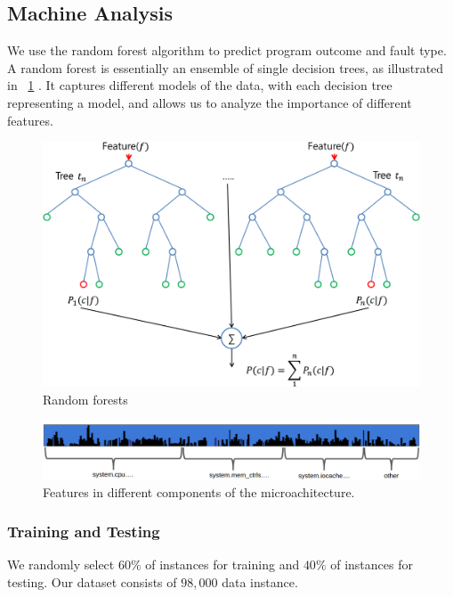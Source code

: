 
\subsection{Machine Analysis}
We use the random forest algorithm to predict program outcome and fault type. A random forest is essentially an ensemble of single decision trees, as illustrated in ~\ref{fig:rf} \cite{breiman2001random}. It captures different models of the data, with each decision tree representing a model, and allows us to analyze the importance of different features. 

\begin{figure}[t]
\begin{center}
   \includegraphics[width=0.95\linewidth]{./figures/rf.png}
\end{center}
   \caption{\footnotesize Random forests}
\label{fig:rf}
\end{figure}


\begin{figure}[t]
\begin{center}
   \includegraphics[width=0.95\linewidth]{./figures/feat_dist.png}
\end{center}
   \caption{\footnotesize Features in different components of the microachitecture.}
\label{fig:feat-dist}
\end{figure}

\subsubsection{Training and Testing}
We randomly select $60\%$ of instances for training and $40\%$ of instances for testing. Our dataset consists of $98,000$ data instance.